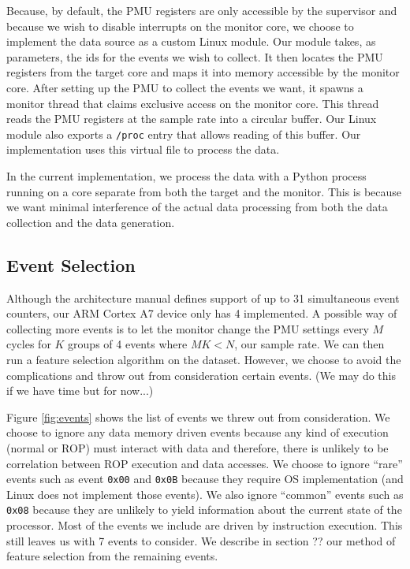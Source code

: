 \documentclass[letterpaper,twocolumn,10pt]{article}
\begin{document}
Because, by default, the PMU registers are only accessible by the supervisor and because 
we wish to disable interrupts on the monitor core, we choose to implement the data source as a 
custom Linux module. Our module takes, as parameters, the ids for the events we wish to collect. It then 
locates the PMU registers from the target core and maps it into memory accessible by the 
monitor core. After setting up the PMU to collect the events we want, it spawns a monitor 
thread that claims exclusive access on the monitor core. This thread reads the PMU registers 
at the sample rate into a circular buffer. Our Linux module also exports a \texttt{/proc} entry 
that allows reading of this buffer. Our implementation uses this virtual file to process the data.

In the current implementation, we process the data with a Python process running on a core 
separate from both the target and the monitor. This is because we want minimal interference 
of the actual data processing from both the data collection and the data generation.

\subsection*{Event Selection}

Although the architecture manual\cite{ARMv7} defines support of up to 31 simultaneous event 
counters, our ARM Cortex A7 device only has 4 implemented. A possible way of collecting 
more events is to let the monitor change the PMU settings every $M$ cycles for $K$ groups of 4 events where 
$M K < N$, our sample rate. We can then run a feature selection algorithm on the dataset. However, we choose to avoid the complications and 
throw out from consideration certain events. (We may do this if we have time but for now...)

Figure \ref{fig:events} shows the list of events we threw out from consideration. We choose to 
ignore any data memory driven events because any kind of execution (normal or ROP) must interact 
with data and therefore, there is unlikely to be correlation between ROP execution and data 
accesses. We choose to ignore ``rare'' events such as event \texttt{0x00} and \texttt{0x0B} 
because they require OS implementation (and Linux does not implement those events). We also 
ignore ``common'' events such as \texttt{0x08} because they are unlikely to yield information 
about the current state of the processor. Most of the events we include are driven by 
instruction execution. This still leaves us with 7 events to consider. We describe 
in section ?? our method of feature selection from the remaining events.
\end{document}
